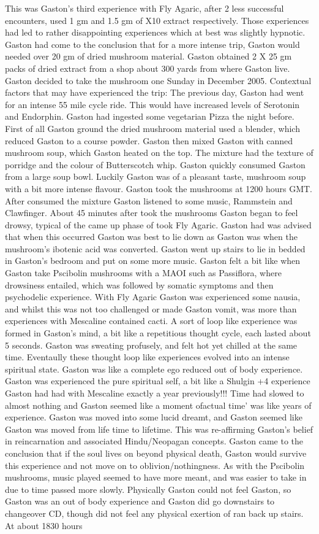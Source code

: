 \documentclass[12pt]{book}
\begin{document}
This was Gaston's third experience with Fly Agaric, after 2 less successful encounters, used 1 gm and 1.5 gm of X10 extract respectively. Those experiences had led to rather disappointing experiences which at best was slightly hypnotic. Gaston had come to the conclusion that for a more intense trip, Gaston would needed over 20 gm of dried mushroom material. Gaston obtained 2 X 25 gm packs of dried extract from a shop about 300 yards from where Gaston live. Gaston decided to take the mushroom one Sunday in December 2005. Contextual factors that may have experienced the trip: The previous day, Gaston had went for an intense 55 mile cycle ride. This would have increased levels of Serotonin and Endorphin. Gaston had ingested some vegetarian Pizza the night before. First of all Gaston ground the dried mushroom material used a blender, which reduced Gaston to a course powder. Gaston then mixed Gaston with canned mushroom soup, which Gaston heated on the top. The mixture had the texture of porridge and the colour of Butterscotch whip. Gaston quickly consumed Gaston from a large soup bowl. Luckily Gaston was of a pleasant taste, mushroom soup with a bit more intense flavour. Gaston took the mushrooms at 1200 hours GMT. After consumed the mixture Gaston listened to some music, Rammstein and Clawfinger. About 45 minutes after took the mushrooms Gaston began to feel drowsy, typical of the came up phase of took Fly Agaric. Gaston had was advised that when this occurred Gaston was best to lie down as Gaston was when the mushroom's ibotenic acid was converted. Gaston went up stairs to lie in bedded in Gaston's bedroom and put on some more music. Gaston felt a bit like when Gaston take Pscibolin mushrooms with a MAOI such as Passiflora, where drowsiness entailed, which was followed by somatic symptoms and then psychodelic experience. With Fly Agaric Gaston was experienced some nausia, and whilst this was not too challenged or made Gaston vomit, was more than experiences with Mescaline contained cacti. A sort of loop like experience was formed in Gaston's mind, a bit like a repetitious thought cycle, each lasted about 5 seconds. Gaston was sweating profusely, and felt hot yet chilled at the same time. Eventaully these thought loop like experiences evolved into an intense spiritual state. Gaston was like a complete ego reduced out of body experience. Gaston was experienced the pure spiritual self, a bit like a Shulgin +4 experience Gaston had had with Mescaline exactly a year previously!!! Time had slowed to almost nothing and Gaston seemed like a moment ofactual time' was like years of experience. Gaston was moved into some lucid dreamt, and Gaston seemed like Gaston was moved from life time to lifetime. This was re-affirming Gaston's belief in reincarnation and associated Hindu/Neopagan concepts. Gaston came to the conclusion that if the soul lives on beyond physical death, Gaston would survive this experience and not move on to oblivion/nothingness. As with the Pscibolin mushrooms, music played seemed to have more meant, and was easier to take in due to time passed more slowly. Physically Gaston could not feel Gaston, so Gaston was an out of body experience and Gaston did go downstairs to changeover CD, though did not feel any physical exertion of ran back up stairs. At about 1830 hours 
\end{document}

